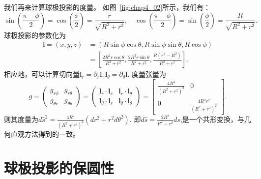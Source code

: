 \documentclass{article}
\begin{document}
我们再来计算球极投影的度量。
如图~\ref{fig:chap4_02}所示，我们有：
\begin{equation*}
\sin\left(\frac{\pi-\phi}{2}\right)
=\cos\left(\frac{\phi}{2}\right)=\frac{r}{\sqrt{R^{2}+r^{2}}}, \quad
\cos\left(\frac{\pi-\phi}{2}\right)
=\sin\left(\frac{\phi}{2}\right)=\frac{R}{\sqrt{R^{2}+r^{2}}}.
\end{equation*}
球极投影的参数化为
\begin{equation*}
\begin{aligned}
\mathbf{l}=(x, y, z)
&=(R\sin\phi\cos\theta, R\sin\phi\sin\theta, R\cos\phi) \\
&=\left[\frac{2R^{2}r\cos\theta}{R^{2}+r^{2}}, \frac{2R^{2}r\sin\theta}{R^{2}+r^{2}}, \frac{R(r^{2}-R^{2})}{R^{2}+r^{2}}\right].
\end{aligned}
\end{equation*}
相应地，可以计算切向量$\mathbf{l}_{r}=\partial_{r}\mathbf{l}, \mathbf{l}_\theta=\partial_{\theta}\mathbf{l}$.
度量张量为
\begin{equation}
g=\begin{pmatrix}
g_{r\phi} & g_{r\theta} \\
g_{\theta{r}} & g_{\theta\theta}
\end{pmatrix}
=\begin{pmatrix}
\mathbf{l}_{r}\cdot\mathbf{l}_{r} & \mathbf{l}_{r}\cdot\mathbf{l}_{\theta} \\
\mathbf{l}_{\theta}\cdot\mathbf{l}_{r} & \mathbf{l}_{\theta}\cdot\mathbf{l}_{\theta}
\end{pmatrix}
=\begin{bmatrix}
\frac{4R^{4}}{\left(R^{2} + r^{2}\right)^{2}} & 0 \\
0 & \frac{4R^{4}r^{2}}{\left(R^{2} + r^{2}\right)^{2}}
\end{bmatrix}.
\end{equation}
则其度量为$d\hat{s}^{2}=\frac{4R^{4}}{\left(R^{2} + r^{2}\right)^{2}}\left(dr^{2}+r^{2}d\theta^{2}\right)$.
即$d\hat{s}=\frac{2R^{2}}{R^{2} + r^{2}}ds$,是一个共形变换，与几何直观方法得到的一致。

\section{球极投影的保圆性}
\end{document}
